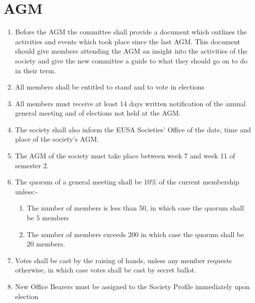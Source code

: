 \documentclass{article}
\begin{document}





\newpage{}
\section{AGM}

\begin{enumerate}

  \item Before the AGM the committee shall provide a document which outlines
    the activities and events which took place since the last AGM. This document
    should give members attending the AGM an insight into the activities
    of the society and give the new committee a guide to what they
    should go on to do in their term.

  \item All members shall be entitled to stand and to vote in elections

  \item All members must receive at least 14 days written notification of the annual
    general meeting and of elections not held at the AGM.

  \item The society shall also inform the EUSA Societies’ Office of the date, time and
    place of the society’s AGM.

  \item The AGM of the society must take place between week 7 and week 11 of
    semester 2.

  \item The quorum of a general meeting shall be 10\% of the current membership
    unless:-
    \begin{enumerate}
      \item The number of members is less than 50, in which case the quorum
        shall be 5 members
      \item The number of members exceeds 200 in which case the quorum shall
        be 20 members.
    \end{enumerate}

  \item Votes shall be cast by the raising of hands, unless any member requests
    otherwise, in which case votes shall be cast by secret ballot.

  \item New Office Bearers must be assigned to the Society Profile immediately
    upon election


\end{enumerate}
\end{document}
